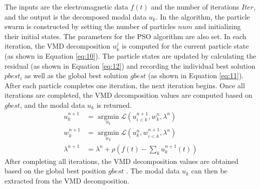 \documentclass[3p,authoryear,preprint,12pt]{elsarticle}
\begin{document}
The inputs are the electromagnetic data $f(t)$  and the number of iterations $Iter$, and the output is the decomposed modal data $u_k$. In the algorithm, the particle swarm is constructed by setting the number of particles $num$  and initializing their initial states. The parameters for the PSO algorithm are also set. In each iteration, the VMD decomposition $u_k^j$  is computed for the current particle state (as shown in Equation \ref{eq:10}). The particle states are updated by calculating the residual (as shown in Equation \ref{eq:12}) and recording the individual best solution $pbest_{i}$  as well as the global best solution $gbest$  (as shown in Equation \ref{eq:11}). After each particle completes one iteration, the next iteration begins. Once all iterations are completed, the VMD decomposition values are computed based on $gbest$, and the modal data $u_k$  is returned.
\begin{equation}
	\label{eq:10}
	\begin{aligned}
		u_k^{n+1} &= \operatorname*{argmin}_{{u_k}} \mathscr{L}\left( u_{i<k}^{n+1},w_k^n,\lambda^n \right) \\
		w_k^{n+1} &= \operatorname*{argmin}_{{w_k}} \mathscr{L}\left( u_{ k}^{n },w_{i<k}^{n+1},\lambda^n \right)\\
		\lambda^{n+1} &= \lambda^n + \rho \left( f(t) - \sum_k u_k^{n+1}(t) \right)
	\end{aligned}
\end{equation}
After completing all iterations, the VMD decomposition values are obtained based on the global best position $gbest$ . The modal data $u_k$  can then be extracted from the VMD decomposition.
\end{document}
